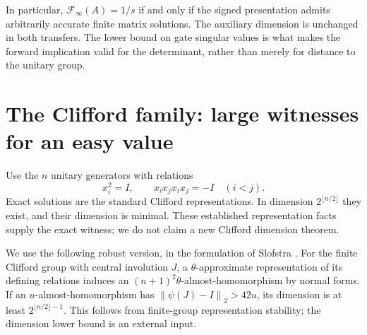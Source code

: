 \documentclass[11pt]{article}
\newcommand{\F}{\mathcal F}
\newcommand{\norm}[1]{\left\lVert#1\right\rVert}
\begin{document}
In particular, $\F_\infty(A)=1/s$ if and only if the signed presentation admits arbitrarily accurate finite matrix solutions. The auxiliary dimension is unchanged in both transfers. The lower bound on gate singular values is what makes the forward implication valid for the determinant, rather than merely for distance to the unitary group.

\section{The Clifford family: large witnesses for an easy value}
Use the $n$ unitary generators with relations
\begin{equation}
 x_i^2=I,\qquad x_ix_jx_ix_j=-I\quad(i<j). \label{eq:Clifford}
\end{equation}
Exact solutions are the standard Clifford representations. In dimension $2^{\lfloor n/2\rfloor}$ they exist, and their dimension is minimal. These established representation facts supply the exact witness; we do not claim a new Clifford dimension theorem.

We use the following robust version, in the formulation of Slofstra \cite[Lemmas 3.1 and 3.4]{profile}. For the finite Clifford group with central involution $J$, a $\theta$-approximate representation of its defining relations induces an $(n+1)^2\theta$-almost-homomorphism by normal forms. If an $u$-almost-homomorphism has $\norm{\psi(J)-I}_2>42u$, its dimension is at least $2^{\lfloor n/2\rfloor-1}$. This follows from finite-group representation stability; the dimension lower bound is an external input.
\end{document}
